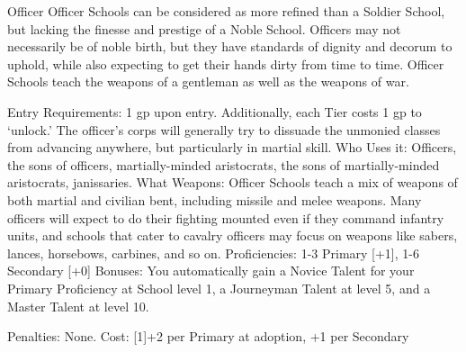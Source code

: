 \documentclass[oneside,11pt,english]{book}
\begin{document}
 

 

Officer 
Officer Schools can be considered as more refined than a Soldier School, but lacking the finesse and 
prestige of a Noble School. Officers may not necessarily be of noble birth, but they have standards of 
dignity and decorum to uphold, while also expecting to get their hands dirty from time to time. Officer 
Schools teach the weapons of a gentleman as well as the weapons of war. 

 

Entry Requirements: 1 gp upon entry. Additionally, each Tier costs 1 gp to ‘unlock.’ The officer’s corps 
will generally try to dissuade the unmonied classes from advancing anywhere, but particularly in martial 
skill. 
Who Uses it: Officers, the sons of officers, martially-minded aristocrats, the sons of martially-minded 
aristocrats, janissaries. 
What Weapons: Officer Schools teach a mix of weapons of both martial and civilian bent, including 
missile and melee weapons. Many officers will expect to do their fighting mounted even if they command 
infantry units, and schools that cater to cavalry officers may focus on weapons like sabers, lances, 
horsebows, carbines, and so on. 
Proficiencies: 1-3 Primary [+1], 1-6 Secondary [+0] 
Bonuses: You automatically gain a Novice Talent for your Primary Proficiency at School level 1, a 
Journeyman Talent at level 5, and a Master Talent at level 10. 


Penalties: None. 
Cost: [1]+2 per Primary at adoption, +1 per Secondary 

 
\end{document}
